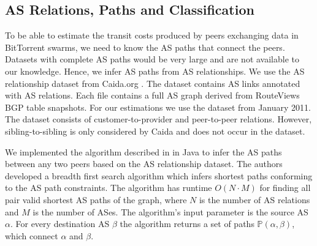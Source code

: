 
\subsection{AS Relations, Paths and Classification}

To be able to estimate the transit costs produced by peers exchanging data in BitTorrent swarms, we need to know the AS paths that connect the peers. Datasets with complete AS paths would be very large and are not available to our knowledge. Hence, we infer AS paths from AS relationships. 
We use the AS relationship dataset from Caida.org \cite{caidaas}. The dataset contains AS links annotated with AS relations. Each file contains a full AS graph derived from RouteViews BGP table snapshots. For our estimations we use the dataset from January 2011. The dataset consists of customer-to-provider and peer-to-peer relations. However, sibling-to-sibling is only considered by Caida and does not occur in the dataset.

We implemented the algorithm described in \cite{yang2009efficient} in Java to infer the AS paths between any two peers based on the AS relationship dataset. The authors developed a breadth first search algorithm which infers shortest paths conforming to the AS path constraints. The algorithm has runtime $O(N\cdot M)$ for finding all pair valid shortest AS paths of the graph, where $N$ is the number of AS relations and $M$ is the number of ASes.
The algorithm's input parameter is the source AS $\alpha$. For every destination AS $\beta$ the algorithm returns a set of paths $\mathbb{P}(\alpha,\beta)$, which connect $\alpha$ and $\beta$.

